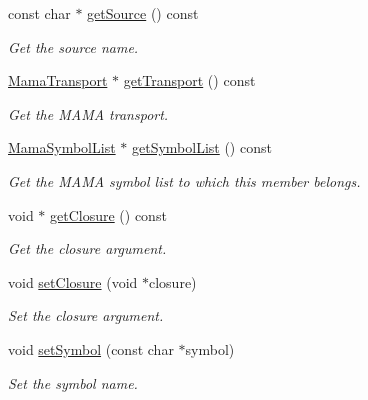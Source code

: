 \begin{DoxyCompactItemize}
const char $\ast$ \hyperlink{classWombat_1_1MamaSymbolListMember_a99e2897642ef172ab36dec52d065bc1f}{getSource} () const 
\begin{DoxyCompactList}\small\item\em Get the source name. \item\end{DoxyCompactList}\item 
\hyperlink{classWombat_1_1MamaTransport}{MamaTransport} $\ast$ \hyperlink{classWombat_1_1MamaSymbolListMember_a50cb26c6342b9184f292201b00671362}{getTransport} () const 
\begin{DoxyCompactList}\small\item\em Get the MAMA transport. \item\end{DoxyCompactList}\item 
\hyperlink{classWombat_1_1MamaSymbolList}{MamaSymbolList} $\ast$ \hyperlink{classWombat_1_1MamaSymbolListMember_a9cbe372a97a3fb7ce1596c28a5577495}{getSymbolList} () const 
\begin{DoxyCompactList}\small\item\em Get the MAMA symbol list to which this member belongs. \item\end{DoxyCompactList}\item 
void $\ast$ \hyperlink{classWombat_1_1MamaSymbolListMember_aa98bb1713122db2e76f76925d67c292e}{getClosure} () const 
\begin{DoxyCompactList}\small\item\em Get the closure argument. \item\end{DoxyCompactList}\item 
void \hyperlink{classWombat_1_1MamaSymbolListMember_aa56da8d3fa7b9531cc8fb059ba83f396}{setClosure} (void $\ast$closure)
\begin{DoxyCompactList}\small\item\em Set the closure argument. \item\end{DoxyCompactList}\item 
void \hyperlink{classWombat_1_1MamaSymbolListMember_af8dd71310a64a7ff37ac936d0300d7e0}{setSymbol} (const char $\ast$symbol)
\begin{DoxyCompactList}\small\item\em Set the symbol name. \item\end{DoxyCompactList}\item 

\end{DoxyCompactItemize}

